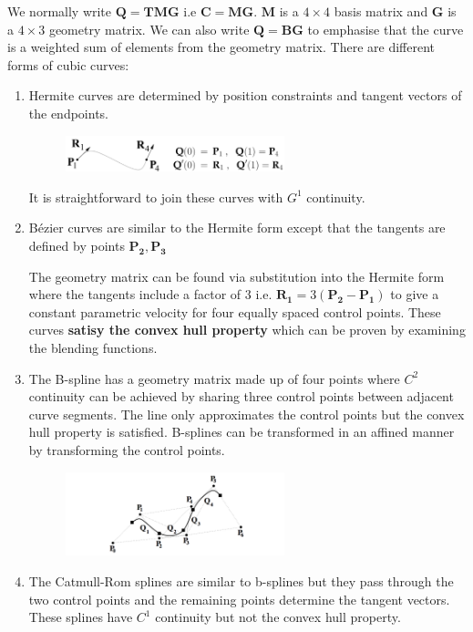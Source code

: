 \documentclass[a4paper]{article}
\newcommand{\ix}[1]{%
  \leavevmode %
  \marginpar{\small\emph{#1}}%
}
\newcommand{\marfig}[2]{
  \marginpar{ \texttt{[image: \#1]} \centering \text{#2} }
}
\newcommand{\vect}[1]{\boldsymbol{\mathbf{#1}}}
\begin{document}
\ix{Matrix Decompositions}We normally write \(\vect{Q=TMG}\) i.e \(\vect{C=MG}\). \(\vect{M}\) is a $4 \times 4$ basis matrix and \(\vect{G}\) is a $4 \times 3$ geometry matrix. We can also write \(\vect{Q=BG}\) to emphasise that the curve is a weighted sum of elements from the geometry matrix. There are different forms of cubic curves:\ix{Curve Types}
\begin{enumerate}
  \item Hermite curves are determined by position constraints and tangent vectors of the endpoints. 
  \begin{figure}[H]
    \centering
    \includegraphics[width=0.6\textwidth]{hermite}
  \end{figure}
  It is straightforward to join these curves with $G^1$ continuity.

  \item Bézier curves are similar to the Hermite form except that the tangents are defined by points $\vect{P_2, P_3}$\marfig{bezier}{}

  The geometry matrix can be found via substitution into the Hermite form where the tangents include a factor of $3$ i.e. $\vect{R_1} = 3\vect{(P_2 - P_1)}$ to give a constant parametric velocity for four equally spaced control points. These curves \textbf{satisy the convex hull property} which can be proven by examining the blending 
  functions.  

  \item The B-spline has a geometry matrix made up of four points where $C^2$ continuity can be achieved by sharing three control points between adjacent curve segments. The line only approximates the control points but the convex hull property is satisfied. B-splines can be transformed in an affined manner by transforming the control points. 

  \begin{figure}[H]
    \centering
    \includegraphics[width=0.6\textwidth]{bspline}
  \end{figure}

  \item The Catmull-Rom splines are similar to b-splines but they pass through the two control points and the remaining points determine the tangent vectors. These splines have $C^1$ continuity but not the convex hull property. 
  
\end{enumerate}
\end{document}
